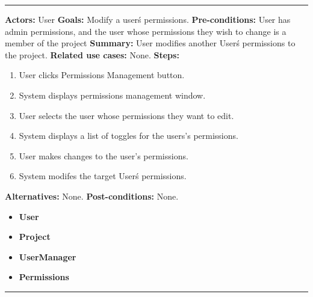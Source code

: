 \documentclass[twoside,letterpaper]{article}
\begin{document}
\vspace{2pt}
\hrule
\vspace{8pt}
 \textbf{Actors:} User \newline
\textbf{Goals:} Modify a user\'s permissions. \newline
 \textbf{Pre-conditions:} User has admin permissions, and the user whose permissions they wish to change is a member of the project\newline
 \textbf{Summary:} User modifies another User\'s permissions to the project. \newline
 \textbf{Related use cases:} None. \newline
\textbf{Steps:} \begin{enumerate}
  \item User clicks Permissions Management button.
  \item System displays permissions management window.
  \item User selects the user whose permissions they want to edit.
  \item System displays a list of toggles for the users's permissions.
  \item User makes changes to the user's permissions.
  \item System modifes the target User\'s permissions.
 \end{enumerate}
 \textbf{Alternatives:} None. \newline
 \textbf{Post-conditions:} None. \newline
\begin{itemize}
	\item \textbf{User}
	\item \textbf{Project}
	\item \textbf{UserManager}
	\item \textbf{Permissions}
\end{itemize}
\vspace{8pt}
\hrule
\newpage
\end{document}
